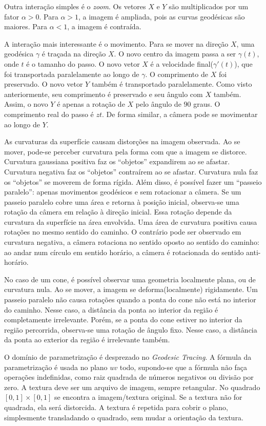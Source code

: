 Outra interação simples é o \textit{zoom}.
Os vetores $X$ e $Y$ são multiplicados por um fator $\alpha > 0$.
Para $\alpha > 1$, a imagem é ampliada, pois as curvas geodésicas são maiores.
Para $\alpha < 1$, a imagem é contraída.

A interação mais interessante é o movimento.
Para se mover na direção $X$, uma geodésica $\gamma$ é traçada na direção $X$.
O novo centro da imagem passa a ser $\gamma(t)$, onde $t$ é o tamanho do passo.
O novo vetor $X$ é a velocidade final($\gamma'(t)$),
que foi transportada paralelamente ao longo
de $\gamma$. O comprimento de $X$ foi preservado.
O novo vetor $Y$ também é transportado paralelamente.
Como visto anteriormente, seu comprimento é preservado e seu ângulo com $X$ também.
Assim, o novo $Y$ é apenas a rotação de $X$ pelo ângulo de $90$ graus.
O comprimento real do passo é $zt$.
De forma similar, a câmera pode se movimentar ao longo de $Y$.

As curvaturas da superfície causam distorções na imagem observada.
Ao se mover, pode-se perceber curvatura pela forma com que a imagem se distorce.
Curvatura gaussiana positiva faz os ``objetos'' expandirem ao se afastar.
Curvatura negativa faz os ``objetos'' contraírem ao se afastar.
Curvatura nula faz os ``objetos'' se moverem de forma rígida.
Além disso, é possível fazer um ``passeio paralelo'': apenas movimentos geodésicos
e sem rotacionar a câmera. Se um passeio paralelo cobre uma área
e retorna à posição inicial, observa-se uma rotação da câmera em relação à direção
inicial. Essa rotação depende da curvatura da superfície na área envolvida.
Uma área de curvatura positiva causa rotações no mesmo sentido do caminho.
O contrário pode ser observado em curvatura negativa, a câmera rotaciona no
sentido oposto ao sentido do caminho: ao andar num círculo em sentido horário,
a câmera é rotacionada do sentido anti-horário.

No caso de um cone, é possível observar uma geometria localmente plana, ou de curvatura nula.
Ao se mover, a imagem se deforma(localmente) rigidamente.
Um passeio paralelo não causa rotações quando a ponta do cone não está no interior do caminho.
Nesse caso, a distância da ponta ao interior da região é completamente irrelevante.
Porém, se a ponta do cone estiver no interior da região percorrida,
observa-se uma rotação de ângulo fixo. Nesse caso, a distância da ponta
ao exterior da região é irrelevante também.

O domínio de parametrização é desprezado no \textit{Geodesic Tracing}.
A fórmula da parametrização é usada no plano $uv$ todo, supondo-se que
a fórmula não faça operações indefinidas, como raiz quadrada de números negativos
ou divisão por zero.
A textura deve ser um arquivo de imagem, sempre retangular.
No quadrado $[0, 1] \times [0, 1]$ se encontra a imagem/textura original.
Se a textura não for quadrada, ela será distorcida. A textura é repetida
para cobrir o plano, simplesmente transladando o quadrado, sem mudar a orientação
da textura.